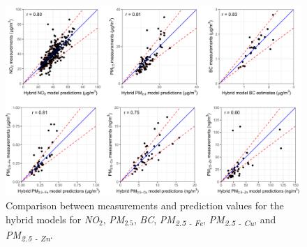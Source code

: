 \documentclass{article}
\begin{document}
\captionsetup[figure]{skip=6pt}
\begin{figure}[!htb]
\includegraphics[width=1.0\textwidth]{figures/fig_HM_test_all_models_v2.png}
\caption{Comparison between measurements and prediction values for the hybrid models for \textit{NO$_2$}, \textit{PM$_{2.5}$}, \textit{BC}, \textit{PM\textsubscript{2.5 - Fe}}, \textit{PM\textsubscript{2.5 - Cu}}, and \textit{PM\textsubscript{2.5 - Zn}}.}
\label{fig2}
\end{figure}




\end{document}

